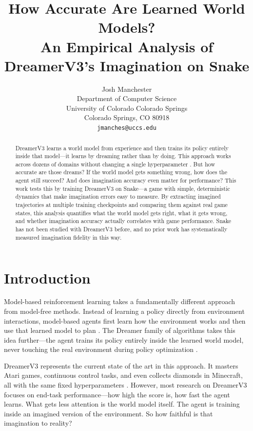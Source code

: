 \documentclass[letterpaper]{article}
\title{How Accurate Are Learned World Models? \\An Empirical Analysis of DreamerV3's Imagination on Snake}
\author{
    Josh Manchester\\
    Department of Computer Science\\
    University of Colorado Colorado Springs\\
    Colorado Springs, CO 80918\\
    \texttt{jmanches@uccs.edu}
}
\begin{document}
\maketitle

\begin{abstract}
DreamerV3 learns a world model from experience and then trains its policy entirely inside that model---it learns by dreaming rather than by doing. This approach works across dozens of domains without changing a single hyperparameter \citep{hafner2025dreamerv3}. But how accurate are those dreams? If the world model gets something wrong, how does the agent still succeed? And does imagination accuracy even matter for performance? This work tests this by training DreamerV3 on Snake---a game with simple, deterministic dynamics that make imagination errors easy to measure. By extracting imagined trajectories at multiple training checkpoints and comparing them against real game states, this analysis quantifies what the world model gets right, what it gets wrong, and whether imagination accuracy actually correlates with game performance. Snake has not been studied with DreamerV3 before, and no prior work has systematically measured imagination fidelity in this way.
\end{abstract}

\section{Introduction}

Model-based reinforcement learning takes a fundamentally different approach from model-free methods. Instead of learning a policy directly from environment interactions, model-based agents first learn how the environment works and then use that learned model to plan \citep{sutton2018rl}. The Dreamer family of algorithms takes this idea further---the agent trains its policy entirely inside the learned world model, never touching the real environment during policy optimization \citep{hafner2020dreamerv1, hafner2021dreamerv2, hafner2025dreamerv3}.

DreamerV3 represents the current state of the art in this approach. It masters Atari games, continuous control tasks, and even collects diamonds in Minecraft, all with the same fixed hyperparameters \citep{hafner2025dreamerv3}. However, most research on DreamerV3 focuses on end-task performance---how high the score is, how fast the agent learns. What gets less attention is the world model itself. The agent is training inside an imagined version of the environment. So how faithful is that imagination to reality?
\end{document}
